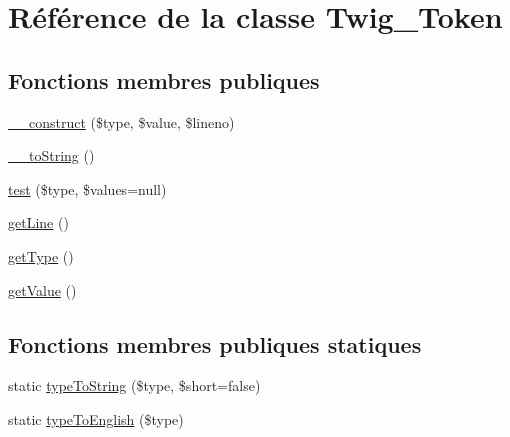 \hypertarget{class_twig___token}{}\section{Référence de la classe Twig\+\_\+\+Token}
\label{class_twig___token}
\subsection*{Fonctions membres publiques}
\begin{DoxyCompactItemize}
\item 
\hyperlink{class_twig___token_afa1726e5a634e7f5e8504348748dc93a}{\+\_\+\+\_\+construct} (\$type, \$value, \$lineno)
\item 
\hyperlink{class_twig___token_a7516ca30af0db3cdbf9a7739b48ce91d}{\+\_\+\+\_\+to\+String} ()
\item 
\hyperlink{class_twig___token_a9cdad590920515cc2bb0fc6bccaf462a}{test} (\$type, \$values=null)
\item 
\hyperlink{class_twig___token_aef9c32f6066788a101028a1d4150f8cb}{get\+Line} ()
\item 
\hyperlink{class_twig___token_a830b5c75df72b32396701bc563fbe3c7}{get\+Type} ()
\item 
\hyperlink{class_twig___token_ac0bc18784b182c89fcfd276625aef435}{get\+Value} ()
\end{DoxyCompactItemize}
\subsection*{Fonctions membres publiques statiques}
\begin{DoxyCompactItemize}
\item 
static \hyperlink{class_twig___token_a5ce0f7a389a79b91d2bba173802c1d22}{type\+To\+String} (\$type, \$short=false)
\item 
static \hyperlink{class_twig___token_a66c50051ad0ab474c853fddfdfc3b8f9}{type\+To\+English} (\$type)
\end{DoxyCompactItemize}
